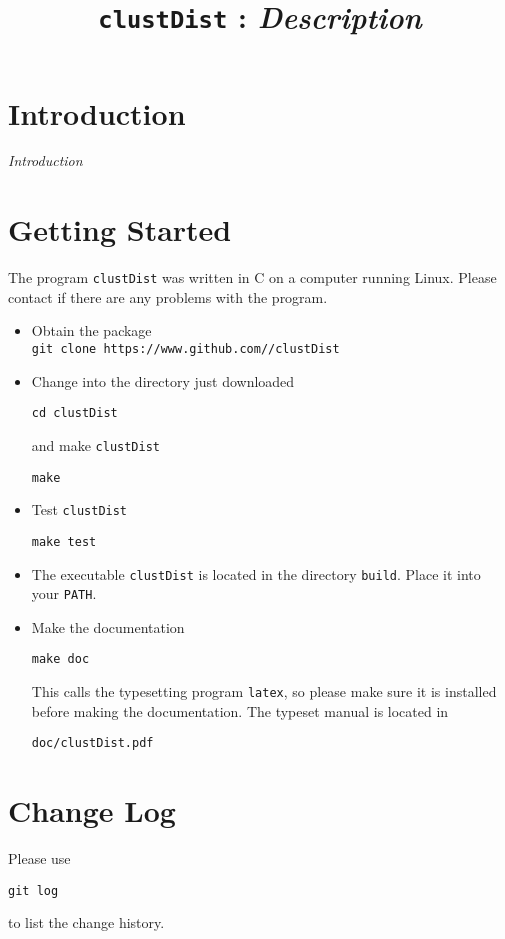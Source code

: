 \documentclass[a4paper, english]{article}
\begin{document}
\title{\texttt{clustDist} : \emph{Description}}
\author{}

\date{}
\maketitle

\section{Introduction} 
\emph{Introduction}

\section{Getting Started}
The program \texttt{clustDist} was written in C on a computer running Linux.
Please contact \texttt{} if there are any problems
with the program.
\begin{itemize}
\item Obtain the package\\
\texttt{git clone https://www.github.com//clustDist}
\item Change into the directory just downloaded
\begin{verbatim}
cd clustDist
\end{verbatim}
and make \texttt{clustDist}
\begin{verbatim}
make
\end{verbatim}
\item Test \texttt{clustDist}
\begin{verbatim}
make test
\end{verbatim}
\item The executable \texttt{clustDist} is located in the
  directory \texttt{build}. Place it into your \texttt{PATH}.
\item Make the documentation
\begin{verbatim}
make doc
\end{verbatim}
This calls the typesetting program \texttt{latex}, so please make sure
it is installed before making the documentation. The typeset manual is
located in
\begin{verbatim}
doc/clustDist.pdf
\end{verbatim}
\end{itemize}

\section{Change Log}
Please use
\begin{verbatim}
git log
\end{verbatim}
to list the change history.

\end{document}
